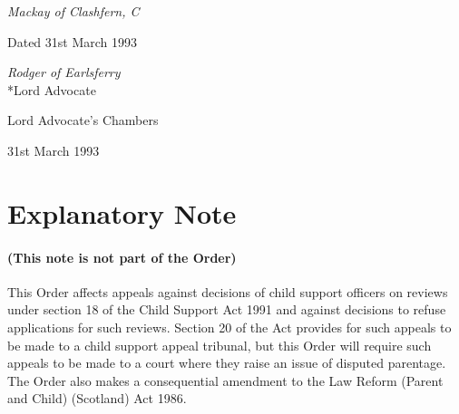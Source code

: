 \documentclass[12pt,a4paper]{article}
\begin{document}
%
%
%
%

\bigskip

{\raggedleft
\emph{Mackay of Clashfern, C}

}

Dated 31st March 1993

\bigskip

{\raggedleft
\emph{Rodger of Earlsferry}\\*Lord Advocate

}

Lord Advocate's Chambers

31st March 1993

\part{Explanatory Note}

\renewcommand\parthead{--- Explanatory Note}

\subsection*{(This note is not part of the Order)}

This Order affects appeals against decisions of child support officers on reviews under section 18 of the Child Support Act 1991 and against decisions to refuse applications for such reviews. Section 20 of the Act provides for such appeals to be made to a child support appeal tribunal, but this Order will require such appeals to be made to a court where they raise an issue of disputed parentage. The Order also makes a consequential amendment to the Law Reform (Parent and Child) (Scotland) Act 1986.
\end{document}
